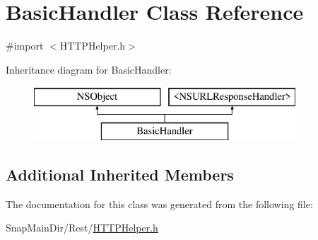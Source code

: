 \hypertarget{interface_basic_handler}{}\section{Basic\+Handler Class Reference}
\label{interface_basic_handler}


{\ttfamily \#import $<$H\+T\+T\+P\+Helper.\+h$>$}

Inheritance diagram for Basic\+Handler\+:\begin{figure}[H]
\begin{center}
\leavevmode
\includegraphics[height=2.000000cm]{interface_basic_handler}
\end{center}
\end{figure}
\subsection*{Additional Inherited Members}


The documentation for this class was generated from the following file\+:\begin{DoxyCompactItemize}
\item 
Snap\+Main\+Dir/\+Rest/\hyperlink{_h_t_t_p_helper_8h}{H\+T\+T\+P\+Helper.\+h}\end{DoxyCompactItemize}
